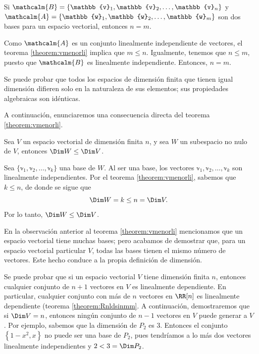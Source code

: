 \begin{corollary}{}{}
    Si $\mathcalm{B} = \{\mathbb{v}_1, \mathbb{v}_2, \dots, \mathbb{v}_n\}$ y $\mathcalm{A} = \{\mathbb{w}_1, \mathbb{w}_2, \dots, \mathbb{w}_m\}$ son dos bases para un espacio vectorial, entonces $n = m$.

    \tcblower
    \demostracion Como $\mathcalm{A}$ es un conjunto linealmente independiente de vectores, el teorema \ref{theorem:vmenorli} implica que $m \leq n$. Igualmente, tenemos que $n \leq m$, puesto que $\mathcalm{B}$ es linealmente independiente. Entonces, $n = m$.
\end{corollary}

Se puede probar que todos los espacios de dimensión finita que tienen igual dimensión difieren solo en la naturaleza de sus elementos; sus propiedades algebraicas son idénticas.

A continuación, enunciaremos una consecuencia directa del teorema \ref{theorem:vmenorli}.

\begin{theorem}{}{}
    Sea $V$ un espacio vectorial de dimensión finita $n$, y sea $W$ un subespacio no nulo de $V$, entonces $\Dim W \leq \Dim V$.

    \tcblower
    \demostracion Sea $\{ \mathbb{v}_1, \mathbb{v}_2, \dots, \mathbb{v}_k \}$ una base de $W$. Al ser una base, los vectores $\mathbb{v}_1, \mathbb{v}_2, \dots, \mathbb{v}_k$ son linealmente independientes. Por el teorema \ref{theorem:vmenorli}, sabemos que $k \leq n$, de donde se sigue que
    $$\Dim W = k \leq n = \Dim V.$$
    Por lo tanto, $\Dim W \leq \Dim V$.
\end{theorem}

En la observación anterior al teorema \ref{theorem:vmenorli} mencionamos que un espacio vectorial tiene muchas bases; pero acabamos de demostrar que, para un espacio vectorial particular $V$, todas las bases tienen el mismo número de vectores. Este hecho conduce a la propia definición de dimensión.

Se puede probar que si un espacio vectorial $V$ tiene dimensión finita $n$, entonces cualquier conjunto de $n + 1$ vectores en $V$ es linealmente dependiente. En particular, cualquier conjunto con más de $n$ vectores en $\RR[n]$ es linealmente dependiente (teorema \ref{theorem:Rnldsinmm}. A continuación, demostraremos que si $\Dim V = n$, entonces ningún conjunto de $n - 1$ vectores en $V$ puede generar a $V$. Por ejemplo, sabemos que la dimensión de $P_2$ es $3$. Entonces el conjunto $\left\{ 1 - x^2, x \right\}$ no puede ser una base de $P_2$, pues tendríamos a lo más dos vectores linealmente independientes y $2 < 3 = \Dim P_2$.

